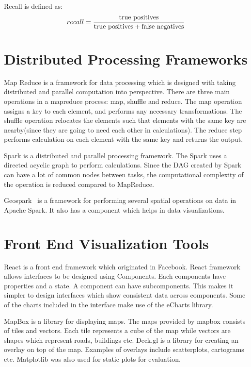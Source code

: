 Recall is defined as:
$$recall = \frac{\textnormal{true positives}}{\textnormal{true positives} + \textnormal{false negatives}}$$

\section{Distributed Processing Frameworks}
Map Reduce\citep{dean2008mapreduce} is a framework for data processing which is designed with taking distributed and parallel computation into perspective. There are three main operations in a mapreduce process: map, shuffle and reduce. The map operation assigns a key to each element, and performs any necessary transformations. The shuffle operation relocates the elements such that elements with the same key are nearby(since they are going to need each other in calculations). The reduce step performs calculation on each element with the same key and returns the output.

Spark\citep{shanahan2015large,zaharia2016apache} is a distributed and parallel processing framework. The Spark uses a directed acyclic graph to perform calculations. Since the DAG created by Spark can have a lot of common nodes between tasks, the computational complexity of the operation is reduced compared to MapReduce.

Geospark~\citep{yu2015geospark} is a framework for performing several spatial operations on data in Apache Spark. It also has a component which helps in data visualizations\citep{yu2018src}.

\section{Front End Visualization Tools}
React\citep{reactjs} is a front end framework which originated in Facebook. React framework allows interfaces to be designed using Components. Each components have properties and a state. A component can have subcomponents. This makes it simpler to design interfaces which show consistent data across components. Some of the charts included in the interface make use of the eCharts library\citep{echarts}.

MapBox\citep{mapbox} is a library for displaying maps. The maps provided by mapbox consists of tiles and vectors. Each tile represents a cube of the map while vectors are shapes which represent roads, buildings etc. Deck.gl\citep{deckgl} is a library for creating an overlay on top of the map. Examples of overlays include scatterplots, cartograms etc. Matplotlib was also used for static plots for evaluation\citep{hunter2007matplotlib}.

